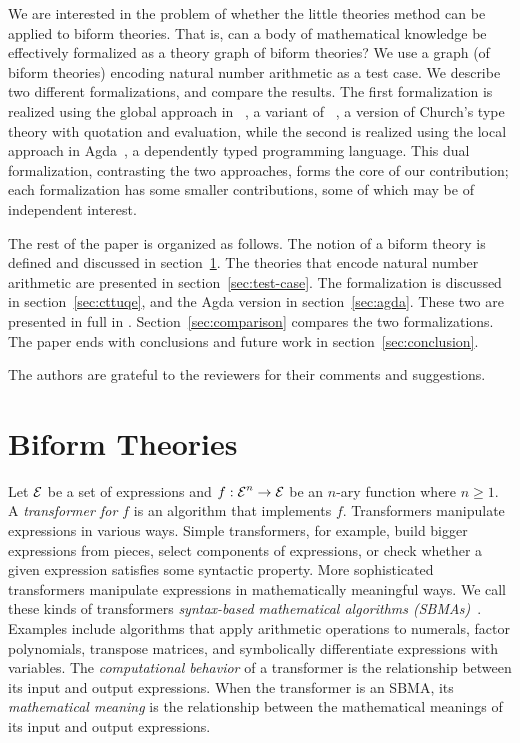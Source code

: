 \documentclass[fleqn]{llncs}
\newcommand{\appendicesref}[2]
  {\iftoggle{cicm}
    {appendices #1 and #2 of \cite{CaretteFarmerArxiv17}}
    {appendices #1 and #2}%
  }
\begin{document}
We are interested in the problem of whether the little theories method
can be applied to biform theories.  That is, can a body of
mathematical knowledge be effectively formalized as a theory graph of
biform theories?  We use a graph (of biform theories) encoding natural
number arithmetic as a test case. We describe two different
formalizations, and compare the results.  The first formalization is
realized using the global approach in
{\churchuqe}~\cite{FarmerArxiv17}, a variant of
{\churchqe}~\cite{FarmerArxiv16,Farmer16}, a version of Church's type
theory with quotation and evaluation, while the second is realized
using the local approach in Agda~\cite{Norell07,Norell09}, a
dependently typed programming language.  This dual formalization,
contrasting the two approaches, forms the core of our contribution;
each formalization has some smaller contributions, some of which may
be of independent interest.

The rest of the paper is organized as follows.  The notion of a biform
theory is defined and discussed in section~\ref{sec:biform}.  The
theories that encode natural number arithmetic are presented in
section~\ref{sec:test-case}.  The {\churchuqe} formalization is
discussed in section~\ref{sec:cttuqe}, and the Agda version in
section~\ref{sec:agda}.  These two are presented in full in
\appendicesref{A}{B}.  Section~\ref{sec:comparison} compares the two
formalizations.  The paper ends with conclusions and future work in
section~\ref{sec:conclusion}.

The authors are grateful to the reviewers for their comments and
suggestions.

\section{Biform Theories}\label{sec:biform}

Let $\mbox{$\cal E$}$ be a set of expressions and $f : \mbox{$\cal E$}^n \rightarrow \mbox{$\cal E$}$ be an
$n$-ary function where $n \ge 1$.  A \emph{transformer for $f$} is an
algorithm that implements $f$.  Transformers manipulate expressions in
various ways.  Simple transformers, for example, build bigger
expressions from pieces, select components of expressions, or check
whether a given expression satisfies some syntactic property.  More
sophisticated transformers manipulate expressions in mathematically
meaningful ways.  We call these kinds of transformers
\emph{syntax-based mathematical algorithms (SBMAs)}~\cite{Farmer13}.
Examples include algorithms that apply arithmetic operations to
numerals, factor polynomials, transpose matrices, and symbolically
differentiate expressions with variables.  The \emph{computational
  behavior} of a transformer is the relationship between its input and
output expressions.  When the transformer is an SBMA, its
\emph{mathematical meaning} is the relationship between the
mathematical meanings of its input and output expressions.
\end{document}
